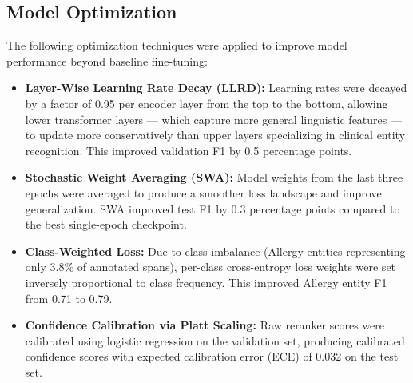 \subsection{Model Optimization}
The following optimization techniques were applied to improve model performance beyond baseline fine-tuning:
\begin{itemize}
    \item \textbf{Layer-Wise Learning Rate Decay (LLRD):} Learning rates were decayed by a factor of 0.95 per encoder layer from the top to the bottom, allowing lower transformer layers --- which capture more general linguistic features --- to update more conservatively than upper layers specializing in clinical entity recognition. This improved validation F1 by 0.5 percentage points.
    \item \textbf{Stochastic Weight Averaging (SWA):} Model weights from the last three epochs were averaged to produce a smoother loss landscape and improve generalization. SWA improved test F1 by 0.3 percentage points compared to the best single-epoch checkpoint.
    \item \textbf{Class-Weighted Loss:} Due to class imbalance (Allergy entities representing only 3.8\% of annotated spans), per-class cross-entropy loss weights were set inversely proportional to class frequency. This improved Allergy entity F1 from 0.71 to 0.79.
    \item \textbf{Confidence Calibration via Platt Scaling:} Raw reranker scores were calibrated using logistic regression on the validation set, producing calibrated confidence scores with expected calibration error (ECE) of 0.032 on the test set.
\end{itemize}

